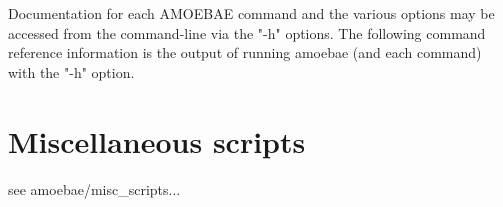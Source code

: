 \documentclass[12pt,letterpaper]{article}
\begin{document}
\begin{linenumbers}
%
%
%
%
%
%
%


Documentation for each AMOEBAE command and the various options may be accessed
from the command-line via the "-h" options. The following command reference
information is the output of running amoebae (and each command) with the "-h"
option.




\section{Miscellaneous scripts}

see amoebae/misc\_scripts...



\printglossaries %

\newpage
\end{linenumbers}

 
\begin{multicols}{2}
{\footnotesize %
}
\end{multicols}
\end{document}
